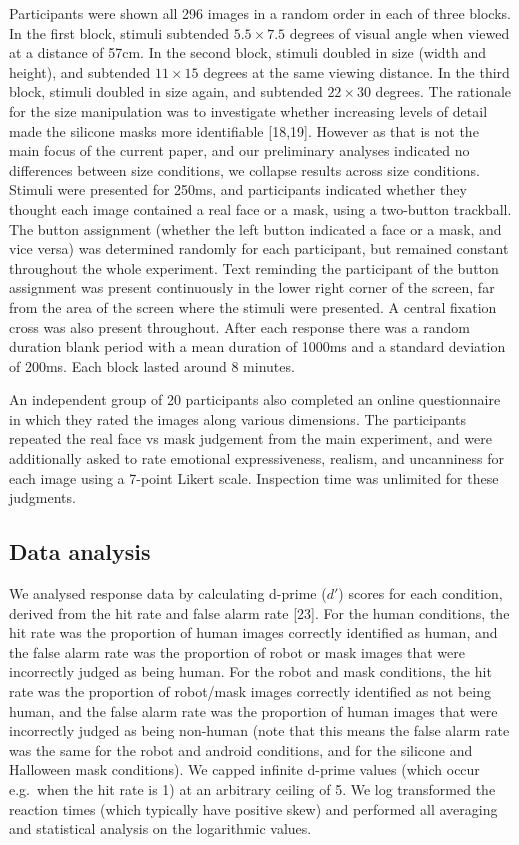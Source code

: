 \documentclass[
]{article}
\begin{document}
Participants were shown all 296 images in a random order in each of three blocks. In the first block, stimuli subtended \(5.5\times7.5\) degrees of visual angle when viewed at a distance of 57cm. In the second block, stimuli doubled in size (width and height), and subtended \(11\times15\) degrees at the same viewing distance. In the third block, stimuli doubled in size again, and subtended \(22\times30\) degrees. The rationale for the size manipulation was to investigate whether increasing levels of detail made the silicone masks more identifiable {[}18,19{]}. However as that is not the main focus of the current paper, and our preliminary analyses indicated no differences between size conditions, we collapse results across size conditions. Stimuli were presented for 250ms, and participants indicated whether they thought each image contained a real face or a mask, using a two-button trackball. The button assignment (whether the left button indicated a face or a mask, and vice versa) was determined randomly for each participant, but remained constant throughout the whole experiment. Text reminding the participant of the button assignment was present continuously in the lower right corner of the screen, far from the area of the screen where the stimuli were presented. A central fixation cross was also present throughout. After each response there was a random duration blank period with a mean duration of 1000ms and a standard deviation of 200ms. Each block lasted around 8 minutes.

An independent group of 20 participants also completed an online questionnaire in which they rated the images along various dimensions. The participants repeated the real face vs mask judgement from the main experiment, and were additionally asked to rate emotional expressiveness, realism, and uncanniness for each image using a 7-point Likert scale. Inspection time was unlimited for these judgments.

\subsection{Data analysis}\label{data-analysis}

We analysed response data by calculating d-prime (\(d'\)) scores for each condition, derived from the hit rate and false alarm rate {[}23{]}. For the human conditions, the hit rate was the proportion of human images correctly identified as human, and the false alarm rate was the proportion of robot or mask images that were incorrectly judged as being human. For the robot and mask conditions, the hit rate was the proportion of robot/mask images correctly identified as not being human, and the false alarm rate was the proportion of human images that were incorrectly judged as being non-human (note that this means the false alarm rate was the same for the robot and android conditions, and for the silicone and Halloween mask conditions). We capped infinite d-prime values (which occur e.g.~when the hit rate is 1) at an arbitrary ceiling of 5. We log transformed the reaction times (which typically have positive skew) and performed all averaging and statistical analysis on the logarithmic values.
\end{document}
